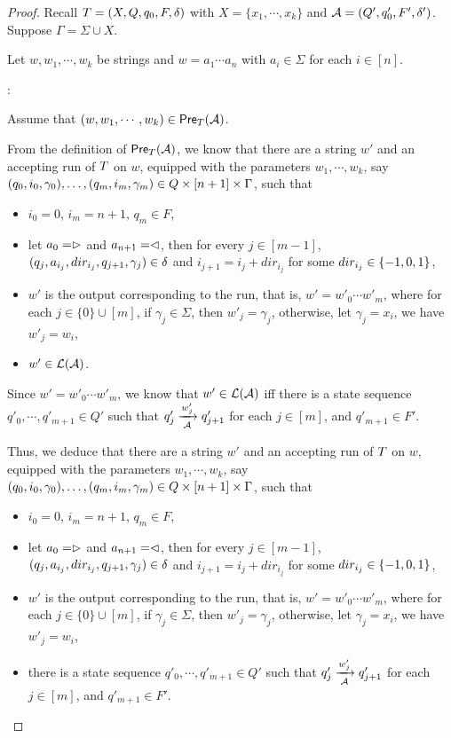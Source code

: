 \begin{proof}
Recall $T = (X, Q, q_0, F, \delta)$ with $X= \{x_1,\cdots, x_k\}$ and $\mathcal{A} = (Q', q'_0, F', \delta')$. 
Suppose $\Gamma = \Sigma \cup X$. 

Let $w, w_1, \cdots, w_k$ be strings and $w = a_1 \cdots a_n$ with $a_i \in \Sigma$ for each $i \in [n]$.

\smallskip

: 

\smallskip

Assume that $(w, w_1,\cdots, w_k) \in \textsf{Pre}_{T}(\mathcal{A})$.


From the definition of $\textsf{Pre}_{T}(\mathcal{A})$, we know that there are a string $w' $ and an accepting run of $T$ on $w$, equipped with the parameters $w_1,\cdots, w_k$, say $(q_0, i_0, \gamma_0),\ldots, (q_m, i_m, \gamma_m) \in Q \times [n+1] \times \Gamma$, such that 
%
\begin{itemize}
\item $i_0=0$, $i_m = n+1$, $q_m \in F$,
%
\item let $a_0 = \vartriangleright$ and $a_{n+1} = \vartriangleleft$,  then for every $j \in [m-1]$, $(q_j, a_{i_j}, dir_{i_j}, q_{j+1}, \gamma_j) \in
        \delta$ and $i_{j+1} = i_j + dir_{i_j}$ for some $dir_{i_j} \in \{-1, 0, 1\}$, 
 \item $w'$ is the output corresponding to the run, that is, $ w' = w'_0 \cdots w'_m$, where for each $j \in \{0\} \cup [m]$, if $\gamma_j \in \Sigma$, then $w'_j = \gamma_j$, otherwise, let $\gamma_j = x_i$, we have $w'_j = w_i$,
 \item  $w' \in \mathcal{L}(\mathcal{A})$.
\end{itemize}

Since $ w' = w'_0 \cdots w'_m$, we know that $w' \in \mathcal{L}(\mathcal{A})$ iff there is a state sequence $q'_0, \cdots, q'_{m+1} \in Q'$ such that $q'_j \xrightarrow[\mathcal{A}]{w'_j} q'_{j+1}$ for each $j \in [m]$, and $q'_{m+1} \in F'$.

Thus, we deduce that 
there are a string $w' $ and an accepting run of $T$ on $w$, equipped with the parameters $w_1,\cdots, w_k$, say $(q_0, i_0, \gamma_0),\ldots, (q_m, i_m, \gamma_m) \in Q \times [n+1] \times \Gamma$, such that 
%
\begin{itemize}
\item $i_0=0$, $i_m = n+1$, $q_m \in F$,
%
\item let $a_0 = \vartriangleright$ and $a_{n+1} = \vartriangleleft$,  then for every $j \in [m-1]$, $(q_j, a_{i_j}, dir_{i_j}, q_{j+1}, \gamma_j) \in
        \delta$ and $i_{j+1} = i_j + dir_{i_j}$ for some $dir_{i_j} \in \{-1, 0, 1\}$, 
 \item $w'$ is the output corresponding to the run, that is, $ w' = w'_0 \cdots w'_m$, where for each $j \in \{0\} \cup [m]$, if $\gamma_j \in \Sigma$, then $w'_j = \gamma_j$, otherwise, let $\gamma_j = x_i$, we have $w'_j = w_i$,
 \item  there is a state sequence $q'_0, \cdots, q'_{m+1} \in Q'$ such that $q'_j \xrightarrow[\mathcal{A}]{w'_j} q'_{j+1}$ for each $j \in [m]$, and $q'_{m+1} \in F'$.
\end{itemize}


\end{proof}
